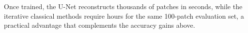 \documentclass[linenumbers,twocolumn]{aastex7}
\begin{document}
Once trained, the U-Net reconstructs thousands of patches in seconds, while
the iterative classical methods require hours for the same 100-patch
evaluation set, a practical advantage that complements the accuracy gains
above.







\end{document}
